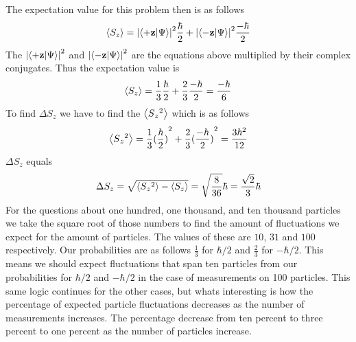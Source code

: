 \documentclass{article}
\begin{document}
The expectation value for this problem then is as follows
\begin{equation}
\expval{S_z}=\abs{\braket{\vb{+z}}{\Psi}}^2\frac{\hbar}{2}+\abs{\braket{\vb{-z}}{\Psi}}^2\frac{-\hbar}{2}
\end{equation}
The $\abs{\braket{\vb{+z}}{\Psi}}^2$ and $\abs{\braket{\vb{-z}}{\Psi}}^2$ are the equations above multiplied by their complex conjugates. 
Thus the expectation value is 
\begin{equation}
\expval{S_z}=\frac{1}{3}\frac{\hbar}{2}+ \frac{2}{3}\frac{-\hbar}{2}=\frac{-\hbar}{6}
\end{equation}
To find $ \Delta S_z$  we have to find the $\expval{S{_z}{^2}}$ which is as follows
\begin{equation}
\expval{S{_z}{^2}}=\frac{1}{3}{(\frac{\hbar}{2})}^2+ \frac{2}{3}{(\frac{-\hbar}{2})}^2=\frac{3\hbar^2}{12}
\end{equation}
$ \Delta S_z$ equals 
\begin{equation}
\Delta S_z=\sqrt{\expval{S{_z}{^2}}-\expval{S_z}}=\sqrt{\frac{8}{36}}\hbar=\frac{\sqrt{2}}{3}\hbar
\end{equation}
For the questions about one hundred, one thousand, and ten thousand particles we take the square root of those numbers to find the amount of fluctuations we expect for the amount of particles. The values of these are $10 $, $ 31 $ and $100$ respectively.  Our probabilities are as follows $\frac{1}{3}$ for $\hbar/2$ and $\frac{2}{3}$ for $-\hbar/2$. This means we should expect fluctuations that span ten particles from our probabilities for $\hbar/2$ and $-\hbar/2$ in the case of measurements on 100 particles.  This same logic continues for the other cases, but whats interesting is how the percentage of expected particle fluctuations decreases as the number of measurements increases. The percentage decrease from ten percent to three percent to one percent as the number of particles increase. 
\end{document}
